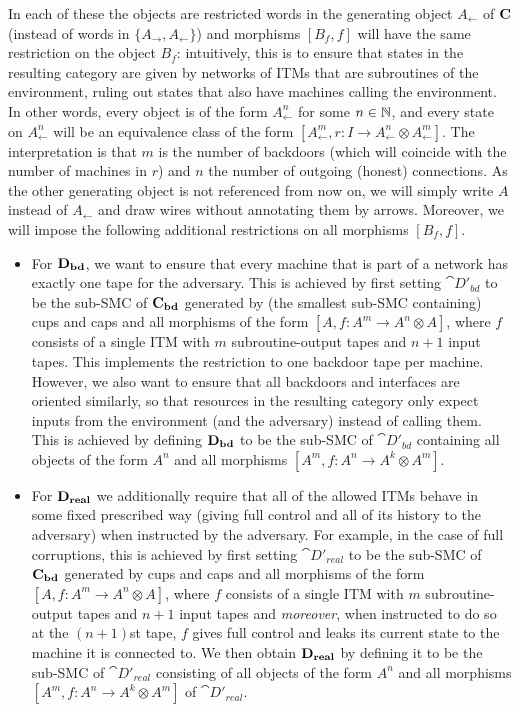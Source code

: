 In each of these the objects are restricted words in the generating object $A_\leftarrow$ of $\mathbf{C}$ (instead of words in $\{A_\rightarrow,A_\leftarrow\}$) and morphisms $[B_f,f]$ will have the same restriction on the object $B_f$: intuitively, this is to ensure that states in the resulting category are given by networks of ITMs that are subroutines of the environment, ruling out states that also have machines calling the environment. In other words, every object is of the form $A_\leftarrow^n$ for some $n\in\mathbb{N}$, and every state on $A_\leftarrow^n$ will be an equivalence class of the form $[A_\leftarrow^m,r \colon I\to A_\leftarrow^n \otimes A_\leftarrow^m]$.  The interpretation is that $m$ is the number of backdoors (which will coincide with the number of machines in $r$) and $n$ the number of 
outgoing (honest) connections. As the other generating object is not referenced from now on, we will simply write $A$ instead of $A_\leftarrow$ and draw wires without annotating them by arrows. Moreover, we will impose the following additional restrictions on all morphisms $[B_f,f]$.
\begin{itemize}
\item For $\mathbf{D_{bd}}$, we want to ensure that every machine that is part of a network  has exactly one tape for the adversary. This is achieved by first setting $\cat{D'_{bd}}$  to be the sub-SMC of $\mathbf{C_{bd}}$ generated by (\ie the smallest sub-SMC containing) cups and caps and 
all morphisms of the form $[A,f \colon A^m\to A^n \otimes A]$, where $f$ consists of a single ITM with $m$ subroutine-output tapes and $n+1$ input tapes. This implements the restriction to one backdoor tape per machine. However, we also want to ensure that all backdoors and interfaces are oriented similarly, so that resources in the resulting category only expect inputs from the environment (and the adversary) instead of calling them. This is achieved by defining $\mathbf{D_{bd}}$ to be the sub-SMC of $\cat{D'_{bd}}$ containing all objects of the form $A^n$ and all morphisms $[A^m,f \colon A^n\to A^{k} \otimes A^m]$. 

\item For $\mathbf{D_{real}}$ we additionally require that all of the allowed ITMs behave in some fixed prescribed  way (\eg giving full control and all of its history to the adversary) when instructed by the adversary. 
For example, in the case of full corruptions, this is achieved by first setting $\cat{D'_{real}}$ to be the sub-SMC of $\mathbf{C_{bd}}$ generated by  cups and caps and  all morphisms of the form $[A,f \colon A^m\to A^n \otimes A]$, where $f$ consists of a single ITM with $m$ subroutine-output tapes and $n+1$ input tapes and \emph{moreover}, when instructed to do so at the $(n+1)$st tape, $f$ gives full control and leaks its current state to the machine it is connected to.
We then obtain $\mathbf{D_{real}}$ by defining it to be the sub-SMC of $\cat{D'_{real}}$ consisting of all objects of the form $A^n$ and all morphisms $[A^m,f \colon A^n\to A^{k} \otimes A^m]$ of  $\cat{D'_{real}}$. 
\end{itemize} 
